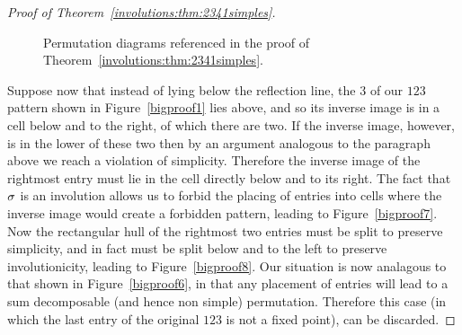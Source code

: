 \begin{proof}[Proof of Theorem~\ref{involutions:thm:2341simples}]
\begin{figure}
{
          } 

          \caption{Permutation diagrams referenced in the proof of
          Theorem~\ref{involutions:thm:2341simples}.}
          \label{figure:6_1-group-2} 
        \end{figure}
        

        Suppose now that instead of lying below the reflection line, the $3$ of
        our $123$ pattern shown in Figure~\ref{bigproof1} lies above, and so its
        inverse image is in a cell below and to the right, of which there are
        two. If the inverse image, however, is in the lower of these two then
        by an argument analogous to the paragraph above we reach a violation of
        simplicity. Therefore the inverse image of the rightmost entry must lie
        in the cell directly below and to its right. The fact that $\sigma$ is an
        involution allows us to forbid the placing of entries into cells where
        the inverse image would create a forbidden pattern, leading to
        Figure~\ref{bigproof7}. Now the rectangular hull of the rightmost two
        entries must be split to preserve simplicity, and in fact must be split
        below and to the left to preserve involutionicity, leading to
        Figure~\ref{bigproof8}. Our situation is now analagous to that shown in
        Figure~\ref{bigproof6}, in that any placement of entries will lead to a
        sum decomposable (and hence non simple) permutation. Therefore this
        case (in which the last entry of the original $123$ is not a fixed
        point), can be discarded. 


\end{proof}
